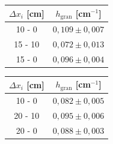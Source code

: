 \documentclass[12pt,twosides,onecolumn,openany]{article}
\newenvironment{Figura}
  {\par\medskip\noindent\minipage{\linewidth}}
  {\endminipage\par\medskip}
\begin{document}
\begin{multicols}{2}
\begin{Figura}
\begin{tabular}{c|c}
        $\Delta x_i$ [cm]  & $h_{\text{gran}}$ [cm$^{-1}$]\\ \hline\hline
        10 - 0 & $0,109\pm0,007$ \\
        15 - 10 & $0,072\pm0,013$ \\
        15 - 0 & $0,096\pm0,004$
      \end{tabular}
    \end{Figura}
    \begin{Figura}
      \centering
      \begin{tabular}{c|c}
        $\Delta x_i$ [cm]  & $h_{\text{gran}}$ [cm$^{-1}$]\\ \hline\hline
        10 - 0 & $0,082\pm0,005$ \\
        20 - 10 & $0,095\pm0,006$ \\
        20 - 0 & $0,088\pm0,003$
      \end{tabular}
    \end{Figura}
\end{multicols}

\end{document}
